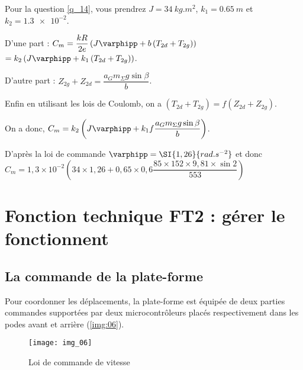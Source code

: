 Pour la question \ref{q_14}, vous prendrez $J =\SI{34}{kg.m^2}$, $k_1 =\SI{0,65}{m}$ et $k_2 = \num{1,3e-2}$.

\ifprof
\begin{corrige}
D'une part : $  C_m  =\dfrac{kR}{2e} \left(J\varphipp  +b\left( T_{2d} +T_{2g} \right)\right) $ 
$=k_2 \left(J\varphipp  +k_1\left( T_{2d} +T_{2g} \right)\right) $.

D'autre part : $Z_{2g}+ Z_{2d}= \dfrac{ a_G  m_\Sigma g \sin \beta  }{b} $.

Enfin en utilisant les lois de Coulomb, on a $\left( T_{2d} +T_{2g} \right) = f\left( Z_{2d} +Z_{2g} \right)$.

On a donc, $  C_m  =k_2 \left(J\varphipp  +k_1f\dfrac{ a_G  m_\Sigma g \sin \beta  }{b}\right) $.

D'après la loi de commande $\varphipp = \SI{1,26}{rad.s^{-2}}$
et donc $C_m = 1,3\times 10^{-2}\left(34\times 1,26 + 0,65 \times 0,6 \dfrac{ 85 \times 152 \times  9,81 \times  \sin 2 }{553}\right)$

\end{corrige}
\else
\fi



\section{Fonction technique FT2 : gérer le fonctionnent}

\subsection{La commande de la plate-forme}

Pour coordonner les déplacements, la plate-forme est équipée de deux parties commandes supportées par deux microcontrôleurs placés respectivement dans les podes avant et arrière (\autoref{img:06}).

\begin{figure}[H]
\centering
\texttt{[image: img\_06]}
\caption{Loi de commande de vitesse \label{img:06}}
\end{figure}

